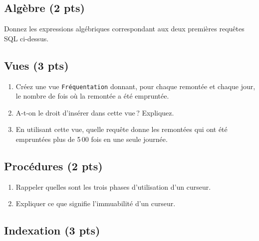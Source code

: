 \subsection*{Algèbre (2 pts)}

Donnez les expressions algébriques correspondant aux deux premières requêtes SQL ci-dessus.


\subsection*{Vues (3 pts)}

\begin{enumerate}
   \item Créez une vue \texttt{Fréquentation} donnant, pour chaque
         remontée et chaque jour, le nombre de fois où la remontée 
             a été empruntée.
     \item A-t-on le droit d'insérer dans cette vue\,? Expliquez.
     
      \item En utilisant cette vue, quelle requête donne les remontées
         qui ont été empruntées plus de 5\,00 fois en une seule journée.
\end{enumerate}


\subsection*{Procédures (2 pts)}

\begin{enumerate}

  \item Rappeler quelles sont les trois phases d'utilisation d'un curseur.
  \item Expliquer ce que signifie l'immuabilité d'un curseur.
 
\end{enumerate}




\subsection*{Indexation (3 pts)}


